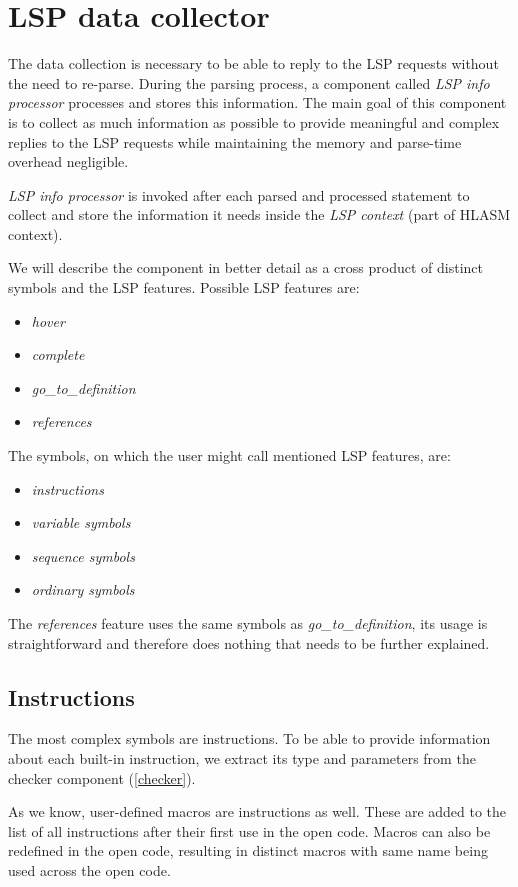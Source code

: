 
\section{LSP data collector}
\label{lsp_data}
The data collection is necessary to be able to reply to the LSP requests without the need to re-parse. During the parsing process, a component called \emph{LSP info processor} processes and stores this information. The main goal of this component is to collect as much information as possible to provide meaningful and complex replies to the LSP requests while maintaining the memory and parse-time overhead negligible.

\emph{LSP info processor} is invoked after each parsed and processed statement to collect and store the information it needs inside the \emph{LSP context} (part of HLASM context). 

We will describe the component in better detail as a cross product of distinct symbols and the LSP features. Possible LSP features are:
\begin{itemize}
	\item \emph{hover}
	\item \emph{complete}
	\item \emph{go\_to\_definition}
	\item \emph{references}
\end{itemize}
The symbols, on which the user might call mentioned LSP features, are:
\begin{itemize}
	\item \emph{instructions}
	\item \emph{variable symbols}
	\item \emph{sequence symbols}
	\item \emph{ordinary symbols}
\end{itemize}

The \emph{references} feature uses the same symbols as \emph{go\_to\_definition}, its usage is straightforward and therefore does nothing that needs to be further explained.

\subsection{Instructions}

The most complex symbols are instructions. To be able to provide information about each built-in instruction, we extract its type and parameters from the checker component (\cref{checker}).

As we know, user-defined macros are instructions as well. These are added to the list of all instructions after their first use in the open code. Macros can also be redefined in the open code, resulting in distinct macros with same name being used across the open code.

